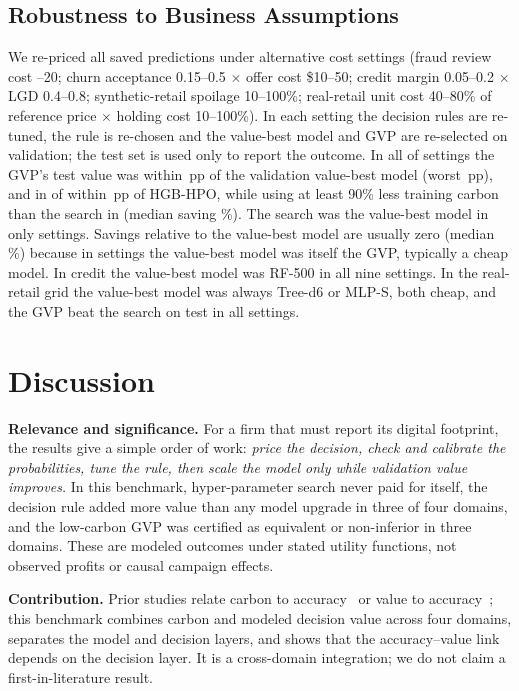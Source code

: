 \documentclass[conference]{IEEEtran}
\begin{document}
\subsection{Robustness to Business Assumptions}
We re-priced all saved predictions under \SensN{} alternative cost settings (fraud review cost --20; churn
acceptance 0.15--0.5 $\times$ offer cost \$10--50; credit margin 0.05--0.2 $\times$ LGD 0.4--0.8; synthetic-retail spoilage
10--100\%; real-retail unit cost 40--80\% of reference price $\times$ holding cost 10--100\%). In each setting the decision
rules are re-tuned, the rule is re-chosen and the value-best model and GVP are re-selected on validation; the test set is
used only to report the outcome. In all \SensWithin{} of \SensN{} settings the GVP's test value was within
\EqMargin\,pp of the validation value-best model (worst \SensWorst\,pp), and in \SensHpoWithin{} of \SensN{} within
\EqMargin\,pp of HGB-HPO, while using at least 90\% less training carbon than the search in \SensHpoNinety{} (median
saving \SensHpoMedian\%). The search was the value-best model in only \SensHpoBest{} settings. Savings relative to the
value-best model are usually zero (median \SensMedianSave\%) because in \SensSame{} settings the value-best model was
itself the GVP, typically a cheap model. In credit the value-best model was RF-500 in all nine settings. In the
real-retail grid the value-best model was always Tree-d6 or MLP-S, both cheap, and the GVP beat the search on test in all
\SensRealN{} settings.

\section{Discussion}
\textbf{Relevance and significance.} For a firm that must report its digital footprint, the results give a simple
order of work: \emph{price the decision, check and calibrate the probabilities, tune the rule, then scale the model only
while validation value improves.} In this benchmark, hyper-parameter search never paid for itself, the decision rule
added more value than any model upgrade in three of four domains, and the low-carbon GVP was certified as equivalent or
non-inferior in three domains. These are modeled outcomes under stated utility functions, not observed profits or causal
campaign effects.

\textbf{Contribution.} Prior studies relate carbon to accuracy~\cite{strubell2019,schwartz2020,ecopt2026} or value to
accuracy~\cite{verbraken2013,hoppner2020}; this benchmark combines carbon and modeled decision value across four domains,
separates the model and decision layers, and shows that the accuracy--value link depends on the decision layer. It is a
cross-domain integration; we do not claim a first-in-literature result.
\end{document}
